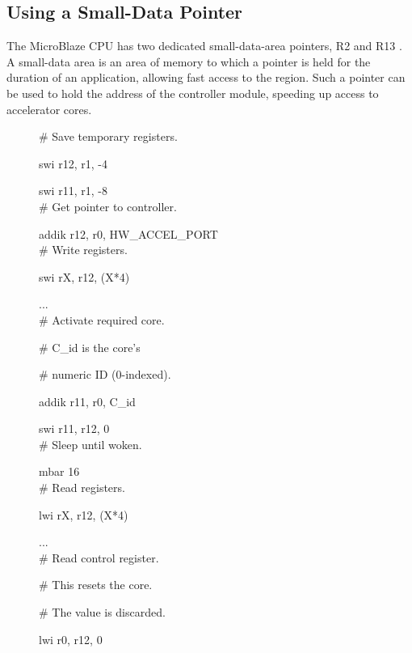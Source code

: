 \documentclass{UoYCSproject}
\newenvironment{monospace}{\ttfamily\small}{\par}
\begin{document}
\subsection{Using a Small-Data Pointer}

The MicroBlaze CPU has two dedicated small-data-area pointers, R2 and R13 \cite{microblaze-ref}.
A small-data area is an area of memory to which a pointer is held for the duration of an application,
allowing fast access to the region. Such a pointer can be used to hold the address of the controller module,
speeding up access to accelerator cores.

\begin{figure}[H]
    \begin{minipage}[t]{0.5\textwidth}
      \begin{monospace}
      \# Save temporary registers.

      swi    r12, r1, -4

      swi    r11, r1, -8
\\

      \# Get pointer to controller.

      addik  r12, r0, HW\_ACCEL\_PORT
\\

      \# Write registers.

      swi    rX, r12, (X*4)

      ...
\\

      \# Activate required core.

      \# C\_id is the core's

      \# numeric ID (0-indexed).

      addik  r11, r0, C\_id

      swi    r11, r12, 0
\\

      \# Sleep until woken.

      mbar   16
\\

      \# Read registers.

      lwi    rX, r12, (X*4)

      ...
\\

      \# Read control register.

      \# This resets the core.

      \# The value is discarded.

      lwi    r0, r12, 0
\\


\end{monospace}
\end{minipage}
\end{figure}
\end{document}
